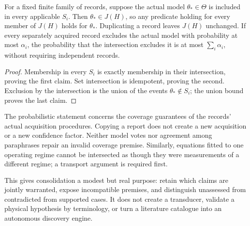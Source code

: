 \begin{proposition}\label{prop:join}
For a fixed finite family of records, suppose the actual model $\theta_*\in\Theta$ is included in every applicable $S_i$. Then $\theta_*\in J(H)$, so any predicate holding for every member of $J(H)$ holds for $\theta_*$. Duplicating a record leaves $J(H)$ unchanged. If every separately acquired record excludes the actual model with probability at most $\alpha_i$, the probability that the intersection excludes it is at most $\sum_i\alpha_i$, without requiring independent records.
\end{proposition}
\begin{proof}
Membership in every $S_i$ is exactly membership in their intersection, proving the first claim. Set intersection is idempotent, proving the second. Exclusion by the intersection is the union of the events $\theta_*\notin S_i$; the union bound proves the last claim.
\end{proof}

The probabilistic statement concerns the coverage guarantees of the records' actual acquisition procedures. Copying a report does not create a new acquisition or a new confidence factor. Neither model votes nor agreement among paraphrases repair an invalid coverage premise. Similarly, equations fitted to one operating regime cannot be intersected as though they were measurements of a different regime; a transport argument is required first.

This gives consolidation a modest but real purpose: retain which claims are jointly warranted, expose incompatible premises, and distinguish unassessed from contradicted from supported cases. It does not create a transducer, validate a physical hypothesis by terminology, or turn a literature catalogue into an autonomous discovery engine.
